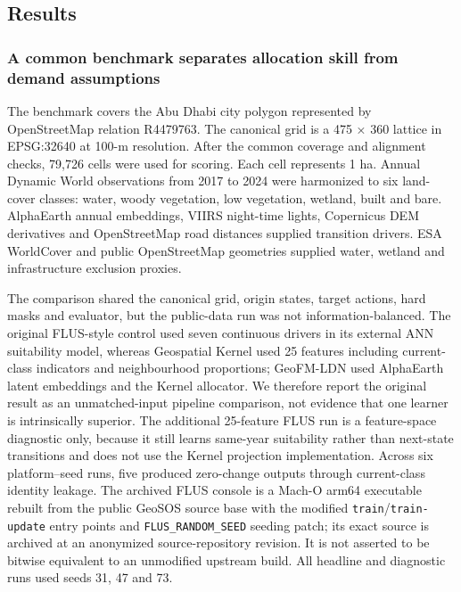 \subsection{Results}\label{results}

\subsubsection{A common benchmark separates allocation skill from demand
assumptions}\label{a-common-benchmark-separates-allocation-skill-from-demand-assumptions}

The benchmark covers the Abu Dhabi city polygon represented by
OpenStreetMap relation R4479763. The canonical grid is a 475 × 360
lattice in EPSG:32640 at 100-m resolution. After the common coverage and
alignment checks, 79,726 cells were used for scoring. Each cell
represents 1 ha. Annual Dynamic World observations from 2017 to 2024
were harmonized to six land-cover classes: water, woody vegetation, low
vegetation, wetland, built and bare. AlphaEarth annual embeddings, VIIRS
night-time lights, Copernicus DEM derivatives and OpenStreetMap road
distances supplied transition drivers. ESA WorldCover and public
OpenStreetMap geometries supplied water, wetland and infrastructure
exclusion proxies.

The comparison shared the canonical grid, origin states, target actions,
hard masks and evaluator, but the public-data run was not
information-balanced. The original FLUS-style control used seven
continuous drivers in its external ANN suitability model, whereas
Geospatial Kernel used 25 features including current-class indicators
and neighbourhood proportions; GeoFM-LDN used AlphaEarth latent
embeddings and the Kernel allocator. We therefore report the original
result as an unmatched-input pipeline comparison, not evidence that one
learner is intrinsically superior. The additional 25-feature FLUS run is
a feature-space diagnostic only, because it still learns same-year
suitability rather than next-state transitions and does not use the
Kernel projection implementation. Across six platform--seed runs, five
produced zero-change outputs through current-class identity leakage. The
archived FLUS console is a Mach-O arm64 executable rebuilt from the
public GeoSOS source base with the modified
\texttt{train}/\texttt{train-update} entry points and
\texttt{FLUS\_RANDOM\_SEED} seeding patch; its exact source is archived
at an anonymized source-repository revision. It is not asserted to be
bitwise equivalent to an unmodified upstream build. All headline and
diagnostic runs used seeds 31, 47 and 73.

